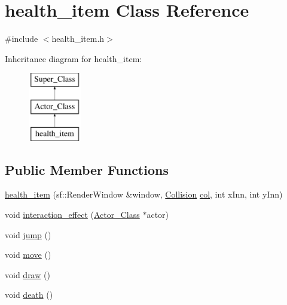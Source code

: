 \hypertarget{classhealth__item}{}\section{health\+\_\+item Class Reference}
\label{classhealth__item}


{\ttfamily \#include $<$health\+\_\+item.\+h$>$}

Inheritance diagram for health\+\_\+item\+:\begin{figure}[H]
\begin{center}
\leavevmode
\includegraphics[height=3.000000cm]{classhealth__item}
\end{center}
\end{figure}
\subsection*{Public Member Functions}
\begin{DoxyCompactItemize}
\item 
\hyperlink{classhealth__item_a518db4a537e9102a4fe0b9f18ab3de91}{health\+\_\+item} (sf\+::\+Render\+Window \&window, \hyperlink{class_collision}{Collision} \hyperlink{classhealth__item_a9abffa822bf114c7a57f8516deefeb57}{col}, int x\+Inn, int y\+Inn)
\item 
void \hyperlink{classhealth__item_a97005bdbe125d68fb6cd5561081674e2}{interaction\+\_\+effect} (\hyperlink{class_actor___class}{Actor\+\_\+\+Class} $\ast$actor)
\item 
void \hyperlink{classhealth__item_af7e8d841f469ac5e225429aaddb06844}{jump} ()
\item 
void \hyperlink{classhealth__item_a60ce7f7099abb26dcc159fdf115d63eb}{move} ()
\item 
void \hyperlink{classhealth__item_aa9b9410c9e524d807327e682e11d1482}{draw} ()
\item 
void \hyperlink{classhealth__item_a9835f457ffbd1a9e157eac9423ae1201}{death} ()
\end{DoxyCompactItemize}

